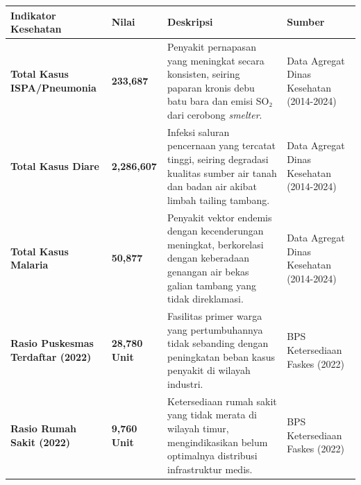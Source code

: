 \documentclass[
]{article}
\newcounter{none} %
\begin{document}
{\def\LTcaptype{none} %
\begin{longtable}[]{@{}
  >{\raggedright\arraybackslash}p{}
  >{\raggedright\arraybackslash}p{}
  >{\raggedright\arraybackslash}p{}
  >{\raggedright\arraybackslash}p{}@{}}
\toprule\noalign{}
\begin{minipage}[b]{\linewidth}\raggedright
Indikator Kesehatan
\end{minipage} & \begin{minipage}[b]{\linewidth}\raggedright
Nilai
\end{minipage} & \begin{minipage}[b]{\linewidth}\raggedright
Deskripsi
\end{minipage} & \begin{minipage}[b]{\linewidth}\raggedright
Sumber
\end{minipage} \\
\midrule\noalign{}
\endhead
\bottomrule\noalign{}
\endlastfoot
\textbf{Total Kasus ISPA/Pneumonia} & \textbf{233,687} & Penyakit
pernapasan yang meningkat secara konsisten, seiring paparan kronis debu
batu bara dan emisi SO₂ dari cerobong \emph{smelter}. & Data Agregat
Dinas Kesehatan (2014-2024) \\
\textbf{Total Kasus Diare} & \textbf{2,286,607} & Infeksi saluran
pencernaan yang tercatat tinggi, seiring degradasi kualitas sumber air
tanah dan badan air akibat limbah tailing tambang. & Data Agregat Dinas
Kesehatan (2014-2024) \\
\textbf{Total Kasus Malaria} & \textbf{50,877} & Penyakit vektor endemis
dengan kecenderungan meningkat, berkorelasi dengan keberadaan genangan
air bekas galian tambang yang tidak direklamasi. & Data Agregat Dinas
Kesehatan (2014-2024) \\
\textbf{Rasio Puskesmas Terdaftar (2022)} & \textbf{28,780 Unit} &
Fasilitas primer warga yang pertumbuhannya tidak sebanding dengan
peningkatan beban kasus penyakit di wilayah industri. & BPS Ketersediaan
Faskes (2022) \\
\textbf{Rasio Rumah Sakit (2022)} & \textbf{9,760 Unit} & Ketersediaan
rumah sakit yang tidak merata di wilayah timur, mengindikasikan belum
optimalnya distribusi infrastruktur medis. & BPS Ketersediaan Faskes
(2022) \\
\end{longtable}
}
\end{document}
